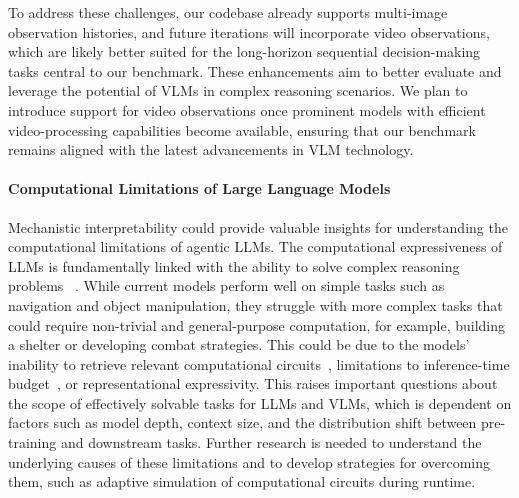 To address these challenges, our codebase already supports multi-image observation histories, and future iterations will incorporate video observations, which are likely better suited for the long-horizon sequential decision-making tasks central to our benchmark. These enhancements aim to better evaluate and leverage the potential of VLMs in complex reasoning scenarios. We plan to introduce support for video observations once prominent models with efficient video-processing capabilities become available, ensuring that our benchmark remains aligned with the latest advancements in VLM technology.




\paragraph{Computational Limitations of Large Language Models} Mechanistic interpretability could provide valuable insights for understanding the computational limitations of agentic LLMs. The computational expressiveness of LLMs is fundamentally linked with the ability to solve complex reasoning problems ~\citep{wei2022emergent}.
While current models perform well on simple tasks such as navigation and object manipulation, they struggle with more complex tasks that could require non-trivial and general-purpose computation, for example, building a shelter or developing combat strategies. 
This could be due to the models' inability to retrieve relevant computational circuits~\citep{olah2020zoom},  limitations to inference-time budget~\citep{snell2024scaling}, or representational expressivity. 
This raises important questions about the scope of effectively solvable tasks for LLMs and VLMs, which is dependent on factors such as model depth, context size, and the distribution shift between pre-training and downstream tasks. Further research is needed to understand the underlying causes of these limitations and to develop strategies for overcoming them, such as adaptive simulation of computational circuits during runtime. 








